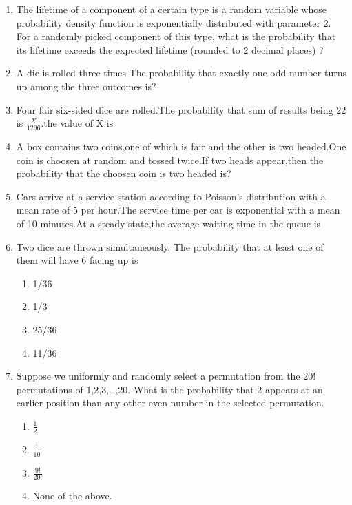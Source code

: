 \documentclass[journal,12pt,twocolumn]{IEEEtran}
\begin{document}
\begin{enumerate}
\begin{enumerate}[label=(\Alph*)]
\end{enumerate}
%
\solution

%
\item The lifetime of a component of a certain type is a random variable whose probability density function is exponentially distributed with parameter 2. For a randomly picked component of this type, what is the probability that its lifetime exceeds the expected lifetime (rounded to 2 decimal places) ?
%
\solution

%
\item A die is rolled three times The probability that exactly one odd number turns up among the three outcomes is?
%
\solution

%
\item Four fair six-sided dice are rolled.The probability that sum of results being 22 is $\frac{X}{1296}$.the value of X is
%
\solution

%
\item A box contains two coins,one of which is fair and the other is two headed.One coin is choosen at random and tossed twice.If two heads appear,then  the probability that the choosen coin is two headed is?
%
\solution

%
\item Cars arrive at a service station according to Poisson's distribution with a mean rate of 5 per hour.The service time per car is exponential with a mean of 10 minutes.At a steady state,the average waiting time in the queue is 
%
\solution

%
\item Two dice are thrown simultaneously. The probability that at least one of them will have 6 facing up is
\begin{enumerate}[label={\Alph*)}]
    \item 1/36
    \item 1/3
    \item 25/36
    \item 11/36
\end{enumerate}
%
\solution

%
\item Suppose we uniformly and randomly select a permutation from the 20\(!\) permutations of 1,2,3,\ldots,20. What is the probability that 2 appears at an earlier position than any other even number in the selected permutation.
\begin{enumerate}[label=(\Alph*)]
    \item \(\displaystyle\frac{1}{2}\)\newline
    \item \(\displaystyle\frac{1}{10}\)\newline
    \item \(\displaystyle\frac{9!}{20!}\)\newline
    \item \normalsize{None of the above.}\newline
\end{enumerate}


\end{enumerate}
\end{document}
